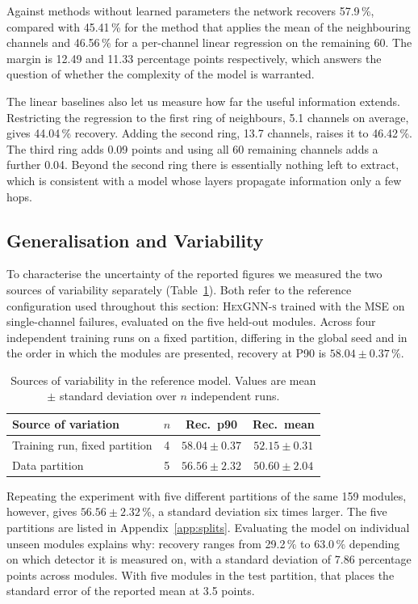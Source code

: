 \documentclass[10pt,conference]{IEEEtran}
\begin{document}
Against methods without learned parameters the network recovers 57.9\,\%,
compared with 45.41\,\% for the method that applies the mean of the neighbouring channels and
46.56\,\% for a per-channel linear regression on the remaining 60. The margin
is 12.49 and 11.33 percentage points respectively, which answers the question
of whether the complexity of the model is warranted.

The linear baselines also let us measure how far the useful information
extends. Restricting the regression to the first ring of neighbours, 5.1
channels on average, gives 44.04\,\% recovery. Adding the second ring, 13.7
channels, raises it to 46.42\,\%. The third ring adds 0.09 points and using all
60 remaining channels adds a further 0.04. Beyond the second ring there is
essentially nothing left to extract, which is consistent with a model whose
layers propagate information only a few hops.

\subsection{Generalisation and Variability}
\label{sec:res-variability}
To characterise the uncertainty of the reported figures we measured the two
sources of variability separately (Table~\ref{tab:reference}). Both refer to
the reference configuration used throughout this section: \textsc{HexGNN-s}
trained with the MSE on single-channel failures, evaluated on the five held-out
modules. Across four independent training runs on a fixed partition, differing
in the global seed and in the order in which the modules are presented,
recovery at P90 is $58.04 \pm 0.37$\,\%.

\begin{table}[t]
\centering
\caption{Sources of variability in the reference model. Values are
mean $\pm$ standard deviation over $n$ independent runs.}
\label{tab:reference}
\begin{tabular}{@{}lccc@{}}
\toprule
\textbf{Source of variation} & \textbf{$n$} & \textbf{Rec.\ p90} & \textbf{Rec.\ mean} \\
\midrule
Training run, fixed partition & 4 & $58.04 \pm 0.37$ & $52.15 \pm 0.31$ \\
Data partition                & 5 & $56.56 \pm 2.32$ & $50.60 \pm 2.04$ \\
\bottomrule
\end{tabular}
\end{table}
Repeating the experiment with five different partitions of the same 159
modules, however, gives $56.56 \pm 2.32$\,\%, a standard deviation six times
larger. The five partitions are listed in Appendix~\ref{app:splits}. Evaluating the model on individual unseen modules explains why:
recovery ranges from
29.2\,\% to 63.0\,\% depending on which detector it is measured on, with a
standard deviation of 7.86 percentage points across modules. With five modules
in the test partition, that places the standard error of the reported mean at
3.5 points.
\end{document}
